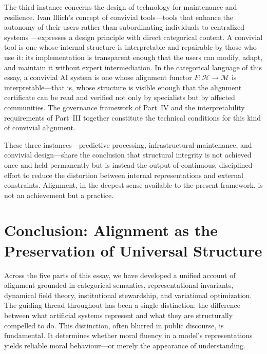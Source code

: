 \documentclass[12pt]{article}
\theoremstyle{definition}
\begin{document}
The third instance concerns the design of technology for maintenance and
resilience. Ivan Illich's concept of convivial tools---tools that enhance the
autonomy of their users rather than subordinating individuals to centralized
systems \citep{illich1973tools}---expresses a design principle with direct
categorical content. A convivial tool is one whose internal structure is
interpretable and repairable by those who use it: its implementation is
transparent enough that the users can modify, adapt, and maintain it without
expert intermediation. In the categorical language of this essay, a convivial
AI system is one whose alignment functor $F : \mathcal{H} \to \mathcal{M}$ is
interpretable---that is, whose structure is visible enough that the alignment
certificate can be read and verified not only by specialists but by affected
communities. The governance framework of Part~IV and the interpretability
requirements of Part~III together constitute the technical conditions for this
kind of convivial alignment.

These three instances---predictive processing, infrastructural maintenance, and
convivial design---share the conclusion that structural integrity is not achieved
once and held permanently but is instead the output of continuous, disciplined
effort to reduce the distortion between internal representations and external
constraints. Alignment, in the deepest sense available to the present framework,
is not an achievement but a practice.


\section*{Conclusion: Alignment as the Preservation of Universal Structure}

Across the five parts of this essay, we have developed a unified account of
alignment grounded in categorical semantics, representational invariants,
dynamical field theory, institutional stewardship, and variational optimization.
The guiding thread throughout has been a single distinction: the difference
between what artificial systems represent and what they are structurally
compelled to do. This distinction, often blurred in public discourse, is
fundamental. It determines whether moral fluency in a model's representations
yields reliable moral behaviour---or merely the appearance of understanding.
\end{document}
